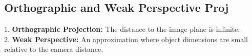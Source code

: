 \subsection*{Orthographic and Weak Perspective Proj}
1. \textbf{Orthographic Projection:} The distance to the image plane is infinite. \\
2. \textbf{Weak Perspective:} An approximation where object dimensions are small relative to the camera distance. \\


